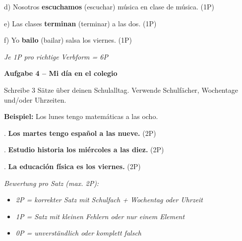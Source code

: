 \documentclass[11pt, a4paper]{article}
\newcommand{\fachfarbe}{spanisch}
\newcommand{\punktebox}[1]{\hfill\fbox{\small \_/#1}}
\newcommand{\lsg}[1]{\textcolor{loesung}{\textbf{#1}}}
\newenvironment{aufgabe}[1]{%
    \needspace{5\baselineskip}%
    \nopagebreak[4]%
    \vspace{10pt}
    \noindent\textbf{\textcolor{\fachfarbe}{Aufgabe #1}}
    \nopagebreak[4]%
    \vspace{5pt}
    \nopagebreak[4]%
    \begin{list}{}{\leftmargin=0pt}
    \item[]
}{%
    \end{list}
}
\begin{document}
\vspace{0.8em}

\noindent
d) Nosotros \lsg{escuchamos} (escuchar) música en clase de música. \hfill (1P)

\vspace{0.8em}

\noindent
e) Las clases \lsg{terminan} (terminar) a las dos. \hfill (1P)

\vspace{0.8em}

\noindent
f) Yo \lsg{bailo} (bailar) salsa los viernes. \hfill (1P)

\textcolor{loesung}{\textit{Je 1P pro richtige Verbform = 6P}}

\vspace{15pt}


\begin{aufgabe}{4 -- Mi día en el colegio}
Schreibe 3 Sätze über deinen Schulalltag. Verwende Schulfächer, Wochentage und/oder Uhrzeiten. \punktebox{6}
\end{aufgabe}

\noindent
\textbf{Beispiel:} Los lunes tengo matemáticas a las ocho.

\vspace{0.8em}

. \lsg{Los martes tengo español a las nueve.} \hfill (2P)

\vspace{1em}

. \lsg{Estudio historia los miércoles a las diez.} \hfill (2P)

\vspace{1em}

. \lsg{La educación física es los viernes.} \hfill (2P)

\vspace{0.5em}

\textcolor{loesung}{\textit{Bewertung pro Satz (max. 2P):}}
\begin{itemize}[leftmargin=2em]
    \item \textcolor{loesung}{\textit{2P = korrekter Satz mit Schulfach + Wochentag oder Uhrzeit}}
    \item \textcolor{loesung}{\textit{1P = Satz mit kleinen Fehlern oder nur einem Element}}
    \item \textcolor{loesung}{\textit{0P = unverständlich oder komplett falsch}}
\end{itemize}
\end{document}
